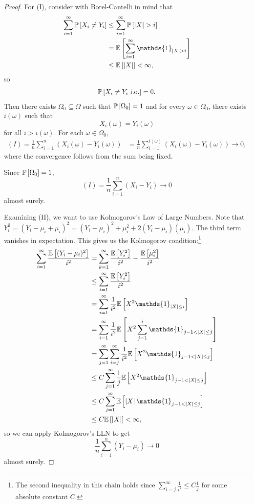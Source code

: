 \begin{proof}
	For (I), consider with Borel-Cantelli in mind that
	\begin{align*}
		\sum\limits_{i=1}^{\infty} \P\left[X_i \ne Y_i\right]  
		&\le \sum\limits_{i=1}^{\infty} \P\left[\left| X \right| > i\right] \\
		&= \E\left[\sum\limits_{i=1}^{\infty} \mathds{1}_{\left| X \right| > i}\right] \\
		&\le \E\left[\left| X \right|\right] < \infty
	,\end{align*} so \[
		\P\left[X_i \ne Y_i\text{ i.o.}\right]  = 0 
	.\] Then there exists $\Omega_0 \subseteq \Omega$ such that $\P\left[\Omega_0\right] = 1$ and for every $\omega \in \Omega_0$, there exists $i(\omega)$ such that \[
		X_i(\omega) = Y_i(\omega)
	\] for all $i > i(\omega)$.
	For each $\omega \in \Omega_0$,
		\begin{align*}
			(I) = \frac{1}{n}\sum\limits_{i=1}^{n} \left( X_i(\omega) - Y_i(\omega) \right)
			&= \frac{1}{n} \sum\limits_{i=1}^{i(\omega)} \left( X_i(\omega) - Y_i(\omega) \right) \to 0
		,\end{align*}
		where the convergence follows from the sum being fixed.

	Since $\P\left[\Omega_0\right] = 1$,
	\[
		(I) = \frac{1}{n} \sum\limits_{i=1}^{n} \left( X_i-Y_i \right) \to 0
	\]
	almost surely.

	Examining (II), we want to use Kolmogorov's Law of Large Numbers. Note that $Y_i^2 = \left( Y_i - \mu_i + \mu_i \right)^2 = (Y_i-\mu_i)^2 + \mu_i^2 + 2(Y_i-\mu_i)(\mu_i)$. The third term vanishes in expectation. This gives us the Kolmogorov condition:\footnote{The second inequality in this chain holds since $\sum_{i=j}^{\infty} \frac{1}{i^2} \le C \frac{1}{j}$ for some absolute constant $C$.}
	\begin{align*}
		\sum\limits_{i=1}^{\infty} \frac{\E\left[(Y_i-\mu_i)^2\right] }{i^2} 
		&= \sum\limits_{k=1}^{\infty} \frac{\E\left[Y_i^2\right] }{i^2} - \frac{\E\left[\mu_i^2\right] }{i^2} \\
		&\le \sum\limits_{i=1}^{\infty} \frac{\E\left[Y_i^2\right] }{i^2} \\
		&= \sum\limits_{i=1}^{\infty} \frac{1}{i^2} \E\left[X^2 \mathds{1}_{\left| X \right|\le i}\right] \\
		&= \sum\limits_{i=1}^{\infty} \frac{1}{i^2} \E\left[X^2 \sum\limits_{j=1}^{i} \mathds{1}_{j-1 < \left| X \right| \le j}\right] \\
		&= \sum\limits_{j=1}^{\infty} \sum\limits_{i=j}^{\infty} \frac{1}{i^2} \E\left[X^2 \mathds{1}_{j - 1 < \left| X \right|\le j}\right] \\
		&\le C \sum\limits_{j=1}^{\infty} \frac{1}{j} \E\left[X^2 \mathds{1}_{j -1 < \left| X \right| \le j}\right] \\
		&\le C \sum\limits_{j=1}^{\infty} \E\left[\left| X \right| \mathds{1}_{j-1 < \left| X \right| \le j}	\right] \\
		&\le C \E\left[\left| X \right|\right] < \infty
	,\end{align*}
	so we can apply Kolmogorov's LLN to get \[
		\frac{1}{n} \sum\limits_{i=1}^{n} \left( Y_i - \mu_i \right) \to 0
	\]  almost surely.


\end{proof}
